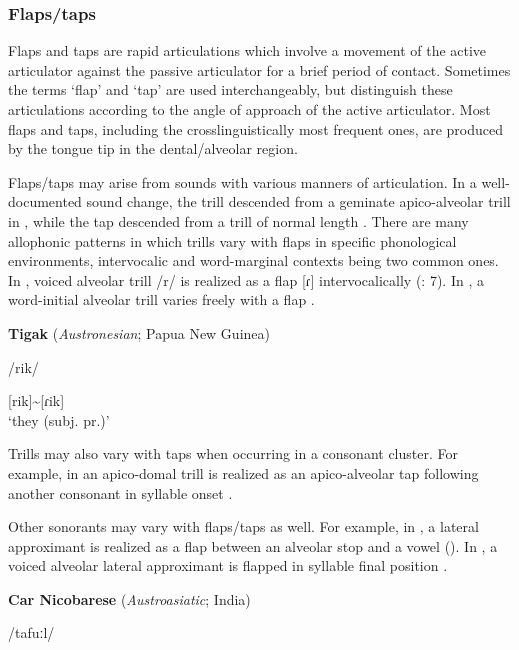 \subsubsection{{Flaps/taps} }\label{sec:4.5.3.2}

  Flaps and taps are rapid articulations which involve a movement of the active articulator against the passive articulator for a brief period of contact. Sometimes the terms ‘flap’ and ‘tap’ are used interchangeably, but \citet{LadefogedMaddieson1996} distinguish these articulations according to the angle of approach of the active articulator. Most flaps and taps, including the crosslinguistically most frequent ones, are produced by the tongue tip in the dental/alveolar region.

  Flaps/taps may arise from sounds with various manners of articulation. In a well-documented sound change, the  trill descended from a geminate apico-alveolar trill in , while the  tap descended from a trill of normal length \citep[17-18]{Hualde2004}. There are many allophonic patterns in which trills vary with flaps in specific phonological environments, intervocalic and word-marginal contexts being two common ones. In , voiced alveolar trill /r/ is realized as a flap [ɾ] intervocalically (\citealt{BlackBlack1971}: 7). In , a word-initial alveolar trill varies freely with a flap .

\ea\label{ex:4.52}
  \textbf{Tigak} (\textit{Austronesian}; Papua New Guinea)

/rik/

[rik]{\textasciitilde}[ɾik]\\
\glt ‘they (subj. pr.)’
\citep[14]{Beaumont1979}
\z

Trills may also vary with taps when occurring in a consonant cluster. For example, in  an apico-domal trill is realized as an apico-alveolar tap following another consonant in syllable onset \citep[3]{Merrifield1963}. 

  Other sonorants may vary with flaps/taps as well. For example, in , a lateral approximant is realized as a flap between an alveolar stop and a vowel (\citealt{BearthZemp1967}). In , a voiced alveolar lateral approximant is flapped in syllable final position .

\ea\label{ex:4.53}
  \textbf{Car Nicobarese} (\textit{Austroasiatic}; India)

/tafuːl/

